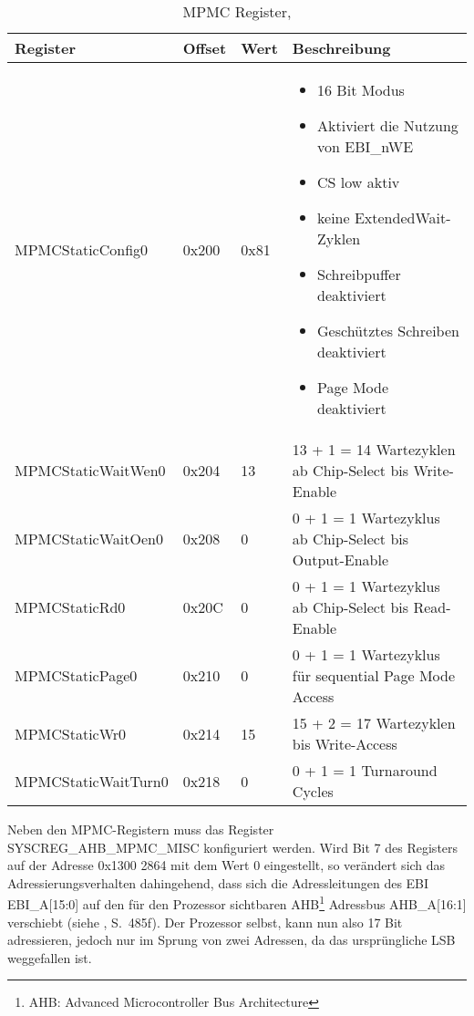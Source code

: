 \begin{table}[h]
\begin{tabular}{|p{4cm}|p{1cm}|p{1cm}|p{6.6cm}|}\hline
\rowcolor{TableBackgroundColor} 
	\textbf{Register} 	& \textbf{Offset} 	& \textbf{Wert} & \textbf{Beschreibung} 							\\ \hline
	MPMCStaticConfig0 	& 0x200 		& 0x81 			& \begin{itemize}
	\item 16 Bit Modus \item Aktiviert die Nutzung von EBI\_nWE \item  CS low aktiv\item  keine ExtendedWait-Zyklen\item  Schreibpuffer deaktiviert\item  Geschütztes Schreiben deaktiviert \item Page Mode deaktiviert 	\end{itemize} 	\\ \hline
	MPMCStaticWaitWen0 	& 0x204 		& 13 			& 13 + 1 = 14 Wartezyklen ab Chip-Select bis Write-Enable 	\\ \hline
	MPMCStaticWaitOen0 	& 0x208 		& 0 			& 0 + 1 = 1 Wartezyklus ab Chip-Select bis Output-Enable  												\\ \hline
	MPMCStaticRd0 		& 0x20C 		& 0 			& 0 + 1 = 1 Wartezyklus ab Chip-Select bis Read-Enable					\\ \hline
	MPMCStaticPage0 	& 0x210 		& 0 			& 0 + 1 = 1 Wartezyklus für sequential Page Mode Access												\\ \hline
	MPMCStaticWr0 		& 0x214 		& 15 			& 15 + 2  = 17 Wartezyklen bis Write-Access	\\ \hline
	MPMCStaticWaitTurn0 & 0x218 		& 0 			& 0 + 1 = 1 Turnaround Cycles 								\\ \hline
\end{tabular}
\caption{MPMC Register, \cite{NXP2010}}
\label{tab:mpmc_config}
\end{table}
\newpage

Neben den MPMC-Registern muss das Register SYSCREG\_AHB\_MPMC\_MISC konfiguriert werden. Wird Bit 7 des Registers  auf der Adresse 0x1300 2864 mit dem Wert 0 eingestellt, so verändert sich das Adressierungsverhalten dahingehend, dass sich die Adressleitungen des EBI EBI\_A[15:0] auf den für den Prozessor sichtbaren AHB\footnote{AHB: Advanced Microcontroller Bus Architecture} Adressbus AHB\_A[16:1] verschiebt (siehe \cite{NXP2010}, S.~485f). Der Prozessor selbst, kann nun also 17 Bit adressieren, jedoch nur im Sprung von zwei Adressen, da das ursprüngliche LSB weggefallen ist.

